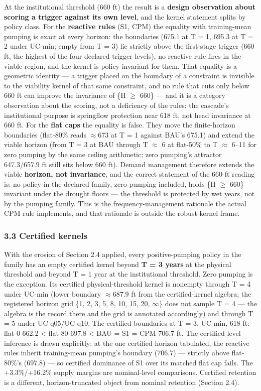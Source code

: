 \documentclass[11pt]{article}
\begin{document}
At the institutional threshold (660 ft) the result is a \textbf{design
observation about scoring a trigger against its own level}, and the
kernel statement splits by policy class. For the \textbf{reactive rules}
(S1, CPM) the equality with training-mean pumping is exact at every
horizon: the boundaries (675.1 at T = 1, 695.3 at T = 2 under UC-min;
empty from T = 3) lie strictly above the first-stage trigger (660 ft,
the highest of the four declared trigger levels), no reactive rule fires
in the viable region, and the kernel is policy-invariant for them. That
equality is a geometric identity --- a trigger placed on the boundary of
a constraint is invisible to the viability kernel of that same
constraint, and no rule that cuts only below 660 ft can improve the
invariance of \{H \ensuremath{\geq} 660\} --- and it is a category observation about the
scoring, not a deficiency of the rules: the cascade's institutional
purpose is springflow protection near 618 ft, not head invariance at 660
ft. For the \textbf{flat caps} the equality is false. They move the
finite-horizon boundaries (flat-80\% reads \ensuremath{\approx}673 at T = 1 against BAU's
675.1) and extend the viable horizon (from T = 3 at BAU through T \ensuremath{\approx} 6 at
flat-50\% to T \ensuremath{\approx} 6--11 for zero pumping by the same ceiling arithmetic;
zero pumping's attractor 647.3/657.9 ft still sits below 660 ft). Demand
management therefore extends the viable \textbf{horizon, not
invariance}, and the correct statement of the 660-ft reading is: no
policy in the declared family, zero pumping included, holds \{H \ensuremath{\geq} 660\}
invariant under the drought floors --- the threshold is protected by wet
years, not by the pumping family. This is the frequency-management
rationale the actual CPM rule implements, and that rationale is outside
the robust-kernel frame.

\subsubsection{3.3 Certified kernels}\label{certified-kernels}

With the erosion of Section 2.4 applied, every positive-pumping policy
in the family has an empty certified kernel beyond \textbf{T = 3 years}
at the physical threshold and beyond T = 1 year at the institutional
threshold. Zero pumping is the exception. Its certified
physical-threshold kernel is nonempty through T = 4 under UC-min (lower
boundary \ensuremath{\approx}687.9 ft from the certified-kernel algebra; the registered
horizon grid \{1, 2, 3, 5, 8, 10, 15, 20, \ensuremath{\infty}\} does not sample T = 4 ---
the algebra is the record there and the grid is annotated accordingly)
and through T = 5 under UC-q05/UC-q10. The certified boundaries at T =
3, UC-min, 618 ft: flat-0 662.2 \textless{} flat-80 697.8 \textless{}
BAU = S1 = CPM 706.7 ft. The certified-level inference is drawn
explicitly: at the one certified horizon tabulated, the reactive rules
inherit training-mean pumping's boundary (706.7) --- strictly above
flat-80\%'s (697.8) --- so certified dominance of S1 over its matched
flat cap fails. The +3.3\%/+16.2\% supply margins are nominal-level
comparisons. Certified retention is a different, horizon-truncated
object from nominal retention (Section 2.4).
\end{document}
